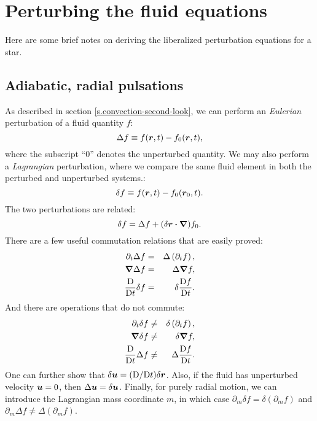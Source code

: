 
\chapter{Perturbing the fluid equations}\label{s.perturbations}

Here are some brief notes on deriving the liberalized perturbation equations for a star.

\section{Adiabatic, radial pulsations} 
As described in section \ref{s.convection-second-look}, we can perform an \emph{Eulerian} perturbation of a fluid quantity $f$:
\begin{equation}
  \Delta f \equiv f(\boldsymbol{r},t)-f_{0}(\boldsymbol{r},t),
\end{equation}
where the subscript ``0'' denotes the unperturbed quantity. We may also perform a \emph{Lagrangian} perturbation, where we compare the same fluid element in both the perturbed and unperturbed systems.:
\begin{equation}
 \delta f \equiv f(\boldsymbol{r},t) - f_{0}(\boldsymbol{r}_{0},t).
\end{equation}
The two perturbations are related:
\begin{equation}
\delta f = \Delta f + (\delta\boldsymbol{r}\boldsymbol{\cdot}\boldsymbol{\nabla})f_{0}.
\end{equation}
There are a few useful commutation relations that are easily proved:
\begin{eqnarray}
\partial_{t}\Delta f &=& \Delta\left(\partial_{t}f\right),\\
\boldsymbol{\nabla} \Delta f &=& \Delta \boldsymbol{\nabla} f,\\
\frac{\mathrm{D}}{\mathrm{D} t}\delta f &=& \delta \frac{\mathrm{D} f}{\mathrm{D} t}.
\end{eqnarray}
And there are operations that do not commute:
\begin{eqnarray}
\partial_{t}\delta f &\neq& \delta\left(\partial_{t}f\right),\\
\boldsymbol{\nabla} \delta f &\neq& \delta \boldsymbol{\nabla} f,\\
\frac{\mathrm{D}}{\mathrm{D} t}\Delta f &\neq& \Delta \frac{\mathrm{D} f}{\mathrm{D} t}.
\end{eqnarray}
One can further show that $\delta\boldsymbol{u} = (\mathrm{D}/\mathrm{D} t)\delta \boldsymbol{r}$. Also, if the fluid has unperturbed velocity $\boldsymbol{u} = 0$, then $\Delta \boldsymbol{u} = \delta \boldsymbol{u}$.  Finally, for purely radial motion, we can introduce the Lagrangian mass coordinate $m$, in which case $\partial_{m}\delta f = \delta(\partial_{m}f)$ and $\partial_{m}\Delta f \neq \Delta(\partial_{m}f)$.

